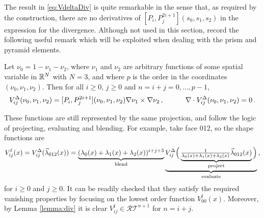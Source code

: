 The result in \eqref{eq:VdeltaDiv} is quite remarkable in the sense that, as required by the construction, there are no derivatives of $[P_i,P_j^{2i+1}](s_0,s_1,s_2)$ in the expression for the divergence. 
Although not used in this section, record the following useful remark which will be exploited when dealing with the prism and pyramid elements.
\begin{remark}
Let $\nu_0=1-\nu_1-\nu_2$, where $\nu_1$ and $\nu_2$ are arbitrary functions of some spatial variable in $\mathbb{R}^N$ with $N=3$, and where $p$ is the order in the coordinates $(\nu_0,\nu_1,\nu_2)$. Then for all $i\geq0$, $j\geq0$ and $n=i+j=0,\ldots,p-1$,
\begin{equation}
    V_{ij}^\Delta(\nu_0,\nu_1,\nu_2)=[P_i,P_j^{2i+1}](\nu_0,\nu_1,\nu_2)\nabla\nu_1\times\nabla\nu_2\,,
    	\quad\qquad \nabla\cdot V_{ij}^\Delta(\nu_0,\nu_1,\nu_2)=0\,.\label{eq:HdivtriangleRemark}
\end{equation}
\end{remark}

These functions are still represented by the same projection, and follow the logic of projecting, evaluating and blending.
For example, take face 012, so the shape functions are
\begin{equation*}
	V_{ij}^\mathrm{f}(x)=V_{ij}^\Delta(\vec{\lambda}_{012}(x))=
		\underbrace{(\lambda_0(x)+\lambda_1(x)+\lambda_2(x))^{i+j+3}}_{\text{blend}}\underbrace{V_{ij}^\Delta
			\Big(\underbrace{\textstyle{\frac{1}{\lambda_0(x)+\lambda_1(x)+\lambda_2(x)}}
				\vec{\lambda}_{012}(x)}_{\text{project}}\Big)}_{\text{evaluate}}\,,
\end{equation*}
for $i\geq0$ and $j\geq0$.
It can be readily checked that they satisfy the required vanishing properties by focusing on the lowest order function $V_{00}^\mathrm{f}(x)$.
Moreover, by Lemma \ref{lemma:div} it is clear $V_{ij}^\mathrm{f}\in\mathcal{RT}^{n+1}$ for $n=i+j$. 

